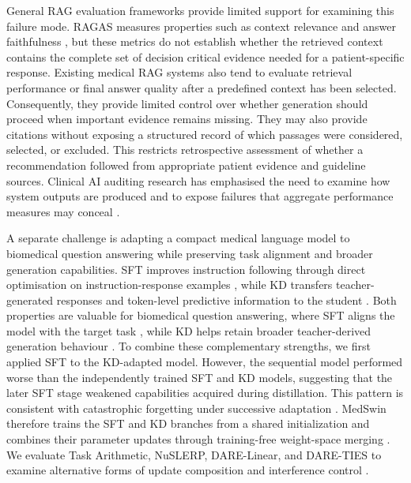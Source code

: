 \documentclass[conference]{IEEEtran}
\begin{document}
General RAG evaluation frameworks provide limited support for examining this failure mode. RAGAS measures properties such as context relevance and answer faithfulness \cite{es2024ragas}, but these metrics do not establish whether the retrieved context contains the complete set of decision critical evidence needed for a patient-specific response. Existing medical RAG systems also tend to evaluate retrieval performance or final answer quality after a predefined context has been selected. Consequently, they provide limited control over whether generation should proceed when important evidence remains missing. They may also provide citations without exposing a structured record of which passages were considered, selected, or excluded. This restricts retrospective assessment of whether a recommendation followed from appropriate patient evidence and guideline sources. Clinical AI auditing research has emphasised the need to examine how system outputs are produced and to expose failures that aggregate performance measures may conceal \cite{liu2022medicalaudit}.

A separate challenge is adapting a compact medical language model to biomedical question answering while preserving task alignment and broader generation capabilities. SFT improves instruction following through direct optimisation on instruction-response examples \cite{wei2022finetuned}, while KD transfers teacher-generated responses and token-level predictive information to the student \cite{yang2025survey}. Both properties are valuable for biomedical question answering, where SFT aligns the model with the target task \cite{wei2022finetuned}, while KD helps retain broader teacher-derived generation behaviour \cite{yang2025survey}. To combine these complementary strengths, we first applied SFT to the KD-adapted model. However, the sequential model performed worse than the independently trained SFT and KD models, suggesting that the later SFT stage weakened capabilities acquired during distillation. This pattern is consistent with catastrophic forgetting under successive adaptation \cite{huang2024mitigating}. MedSwin therefore trains the SFT and KD branches from a shared initialization and combines their parameter updates through training-free weight-space merging \cite{yang2026model}. We evaluate Task Arithmetic, NuSLERP, DARE-Linear, and DARE-TIES to examine alternative forms of update composition and interference control \cite{yadav2023ties,yu2024language, ilharco2022editing, goddard2024arcee}.
\end{document}
